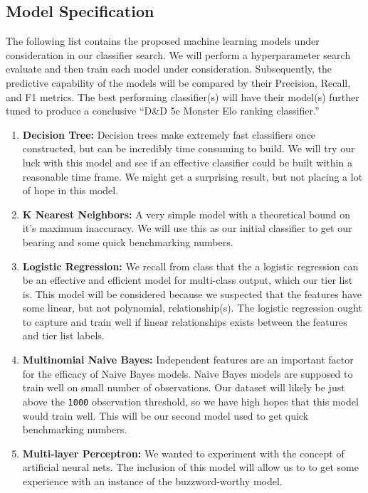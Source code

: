 \documentclass{article}
\newcommand{\DnD}{D\&D 5e\xspace}
\begin{document}
\hypertarget{model-specification}{%
\subsection{Model Specification}\label{model-specification}}
The following list contains the proposed machine learning models under consideration in our classifier search.
We will perform a hyperparameter search evaluate and then train each model under consideration.
Subsequently, the predictive capability of the models will be compared by their Precision, Recall, and F1 metrics.
The best performing classifier(s) will have their model(s) further tuned to produce a conclusive ``\DnD Monster Elo ranking classifier.''

\begin{enumerate}
	\def\labelenumi{\arabic{enumi}.}
	\item
	\textbf{Decision Tree:} Decision trees make extremely fast classifiers once constructed, but can be incredibly time consuming to build.
	We will try our luck with this model and see if an effective classifier could be built within a reasonable time frame.
	We might get a surprising result, but not placing a lot of hope in this model.
	\item
	\textbf{K Nearest Neighbors:} A very simple model with a theoretical bound on it's maximum inaccuracy.
	We will use this as our initial classifier to get our bearing and some quick benchmarking numbers.
	\item
	\textbf{Logistic Regression:} We recall from class that the a logistic regression
	can be an effective and efficient model for multi-class output, which
	our tier list is.
	This model will be considered because we suspected that the features have some linear, but not polynomial, relationship(s).
	The	logistic regression ought to capture and train well if linear relationships exists between the features and tier list labels.
	\item
	\textbf{Multinomial Naive Bayes:} Independent features are an important factor for the efficacy of Naive Bayes models.
	Naive Bayes models are supposed to train well on small number of observations.
	Our dataset will likely be just above the \texttt{1000} observation threshold, so we have high hopes that this model would train well.
	This will be our second model used to get quick benchmarking numbers.
	\item
	\textbf{Multi-layer Perceptron:} We wanted to experiment with the
	concept of artificial neural nets.
	The inclusion of this model will allow us to to get some experience with an instance of the buzzword-worthy model.

\end{enumerate}
\end{document}
